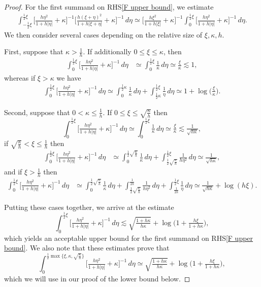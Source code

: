 \documentclass[10pt,a4paper]{amsart}
\begin{document}
\begin{proof}
For the first summand on RHS\eqref{F upper bound}, we estimate
\begin{align*}
\int_{-\frac12\xi}^{\frac12\xi}\bigl[\tfrac{h\eta^2}{1+h|\eta|} +\kappa\bigr]^{-1}\bigl[\tfrac{h(\xi+\eta)^2}{1+h|\xi+\eta|} + \kappa\bigr]^{-1} \,d\eta \simeq \bigl[\tfrac{h\xi^2}{1+h|\xi|} +\kappa\bigr]^{-1}\int_0^{\frac12\xi}\bigl[\tfrac{h\eta^2}{1+h|\eta|} +\kappa\bigr]^{-1}\,d\eta.
\end{align*}
We then consider several cases depending on the relative size of \(\xi,\kappa,h\).

First, suppose that \(\kappa>\frac1h\). If additionally \(0\leq\xi\leq \kappa\), then
\begin{align*}
\int_0^{\frac12\xi}\bigl[\tfrac{h\eta^2}{1+h|\eta|} +\kappa\bigr]^{-1}\,d\eta&\simeq \int_0^{\frac12\xi}\tfrac1\kappa\,d\eta\simeq \tfrac\xi\kappa\lesssim 1,
\end{align*}
whereas if \(\xi>\kappa\) we have
\begin{align*}
\int_0^{\frac12\xi}\bigl[\tfrac{h\eta^2}{1+h|\eta|} +\kappa\bigr]^{-1}\,d\eta\simeq \int_0^{\frac12\kappa}\tfrac1\kappa\,d\eta + \int_{\frac12\kappa}^{\frac12\xi}\tfrac1\eta\,d\eta\simeq 1 + \log\bigl(\tfrac\xi\kappa\bigr).
\end{align*}

Second, suppose that \(0<\kappa\leq \frac1h\). If \(0\leq\xi\leq \sqrt{\frac\kappa h}\) then
\[
\int_0^{\frac12\xi}\bigl[\tfrac{h\eta^2}{1+h|\eta|} +\kappa\bigr]^{-1}\,d\eta \simeq \int_0^{\frac12\xi}\tfrac1\kappa\,d\eta \simeq \tfrac\xi\kappa\lesssim \tfrac1{\sqrt{h\kappa}},
\]
if \(\sqrt{\frac\kappa h}<\xi\leq\frac1h\) then
\begin{align*}
\int_0^{\frac12\xi}\bigl[\tfrac{h\eta^2}{1+h|\eta|} +\kappa\bigr]^{-1}\,d\eta&\simeq \int_0^{\frac12\sqrt{\frac\kappa h}}\tfrac1\kappa\,d\eta + \int_{\frac12\sqrt{\frac\kappa h}}^{\frac12\xi}\tfrac1{h\eta^2}\,d\eta\simeq \tfrac1{\sqrt{h\kappa}},
\end{align*}
and if \(\xi>\frac1h\) then
\begin{align*}
\int_0^{\frac12\xi}\bigl[\tfrac{h\eta^2}{1+h|\eta|} +\kappa\bigr]^{-1}\,d\eta&\simeq \int_0^{\frac12\sqrt{\frac\kappa h}}\tfrac1\kappa\,d\eta + \int_{\frac12\sqrt{\frac\kappa h}}^{\frac1{2h}}\tfrac1{h\eta^2}\,d\eta + \int_{\frac1{2h}}^{\frac12\xi}\tfrac1\eta\,d\eta\simeq \tfrac1{\sqrt{h\kappa}} + \log(h\xi).
\end{align*}

Putting these cases together, we arrive at the estimate
\[
\int_0^{\frac12\xi} \bigl[\tfrac{h\eta^2}{1+h|\eta|} +\kappa\bigr]^{-1} \,d\eta\lesssim \sqrt{\tfrac{1+h\kappa}{h\kappa}} + \log\bigl(1 + \tfrac{h\xi}{1+h\kappa}\bigr),
\]
which yields an acceptable upper bound for the first summand on RHS\eqref{F upper bound}. We also note that these estimates prove that
\begin{equation}\label{lower bound helper}
\int_0^{\frac12\max\{\xi,\kappa,\sqrt{\frac\kappa h}\}} \bigl[\tfrac{h\eta^2}{1+h|\eta|} +\kappa\bigr]^{-1} \,d\eta\simeq \sqrt{\tfrac{1+h\kappa }{h\kappa}} + \log\bigl(1 + \tfrac{h\xi}{1+h\kappa}\bigr),
\end{equation}
which we will use in our proof of the lower bound below.


\end{proof}
\end{document}
